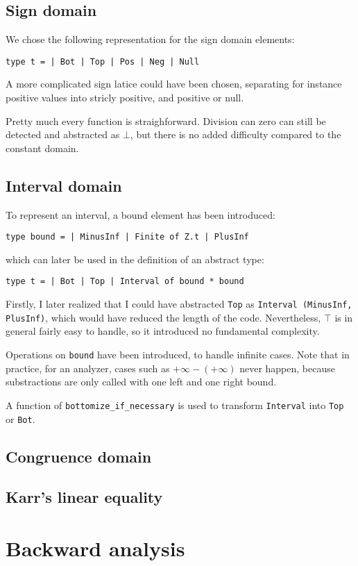 \documentclass[12pt,a4paper]{article}
\begin{document}
\subsection{Sign domain}
We chose the following representation for the sign domain elements:
\begin{center}
    \texttt{type t = | Bot | Top | Pos | Neg | Null}
\end{center}
A more complicated sign latice could have been chosen, separating for instance positive values into stricly positive, and positive or null.

Pretty much every function is straighforward. Division can zero can still be detected and abstracted as $\bot$, but there is no added difficulty compared to the constant domain.

\subsection{Interval domain}
To represent an interval, a bound element has been introduced:
\begin{center}
    \texttt{type bound = | MinusInf | Finite of Z.t | PlusInf}
\end{center}
which can later be used in the definition of an abstract type:
\begin{center}
    \texttt{type t  = | Bot | Top | Interval of bound * bound}
\end{center}
Firstly, I later realized that I could have abstracted \texttt{Top} as \texttt{Interval (MinusInf, PlusInf)}, which would have reduced the length of the code. Nevertheless, $\top$ is in general fairly easy to handle, so it introduced no fundamental complexity.

Operations on \texttt{bound} have been introduced, to handle infinite cases. Note that in practice, for an analyzer, cases such as $+\infty - (+\infty)$ never happen, because substractions are only called with one left and one right bound.

A function of \texttt{bottomize\_if\_necessary} is used to transform \texttt{Interval} into \texttt{Top} or \texttt{Bot}.

\subsection{Congruence domain}

\subsection{Karr's linear equality}

\section{Backward analysis}
\end{document}
